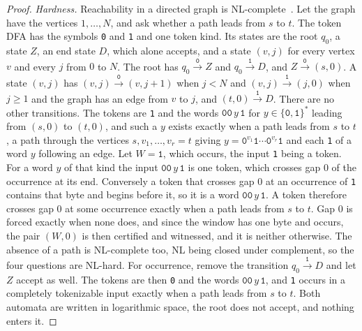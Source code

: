 \documentclass[11pt,a4paper]{article}
\theoremstyle{definition}
\theoremstyle{plain}
\newcommand{\code}[1]{\texttt{#1}}
\begin{document}
\begin{proof}
\emph{Hardness.} Reachability in a directed graph is NL-complete~\cite{jones1975space}. Let the graph have the vertices
$1, \ldots, N$, and ask whether a path leads from $s$ to $t$. The token DFA has the symbols \code{0} and \code{1} and
one token kind. Its states are the root $q_0$, a state $Z$, an end state $D$, which alone accepts, and a state $(v, j)$
for every vertex $v$ and every $j$ from $0$ to $N$. The root has $q_0 \xrightarrow{\code{0}} Z$ and
$q_0 \xrightarrow{\code{1}} D$, and $Z \xrightarrow{\code{0}} (s, 0)$. A state $(v, j)$ has
$(v, j) \xrightarrow{\code{0}} (v, j + 1)$ when $j < N$ and $(v, j) \xrightarrow{\code{1}} (j, 0)$ when $j \geq 1$ and
the graph has an edge from $v$ to $j$, and $(t, 0) \xrightarrow{\code{1}} D$. There are no other transitions. The tokens
are \code{1} and the words $\code{00}\, y\, \code{1}$ for $y \in \{\code{0}, \code{1}\}^*$ leading from $(s, 0)$ to
$(t, 0)$, and such a $y$ exists exactly when a path leads from $s$ to $t$, a path through the vertices
$s, v_1, \ldots, v_r = t$ giving $y = \code{0}^{v_1} \code{1} \cdots \code{0}^{v_r} \code{1}$ and each \code{1} of a
word $y$ following an edge. Let $W = \code{1}$, which occurs, the input \code{1} being a token. For a word $y$ of that
kind the input $\code{00}\, y\, \code{1}$ is one token, which crosses gap $0$ of the occurrence at its end. Conversely a
token that crosses gap $0$ at an occurrence of \code{1} contains that byte and begins before it, so it is a word
$\code{00}\, y\, \code{1}$. A token therefore crosses gap $0$ at some occurrence exactly when a path leads from $s$ to
$t$. Gap $0$ is forced exactly when none does, and since the window has one byte and occurs, the pair $(W, 0)$ is then
certified and witnessed, and it is neither otherwise. The absence of a path is NL-complete too, NL being closed under
complement, so the four questions are NL-hard. For occurrence, remove the transition $q_0 \xrightarrow{\code{1}} D$ and
let $Z$ accept as well. The tokens are then \code{0} and the words $\code{00}\, y\, \code{1}$, and \code{1} occurs in a
completely tokenizable input exactly when a path leads from $s$ to $t$. Both automata are written in logarithmic space,
the root does not accept, and nothing enters it.


\end{proof}
\end{document}

